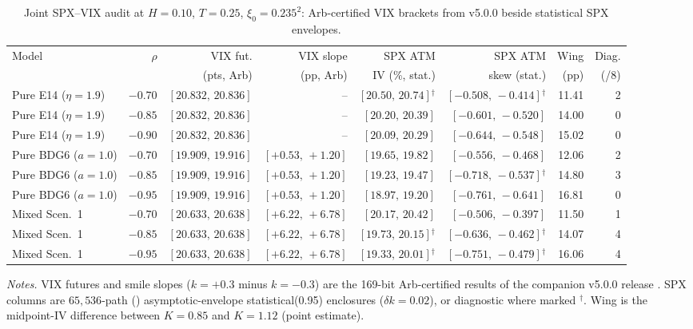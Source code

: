 \begin{table}[t]
\centering
\caption{Joint SPX--VIX audit at $H=0.10$, $T=0.25$, $\xi_0=0.235^2$: Arb-certified VIX brackets from \RoughCert{} v5.0.0 beside statistical \RCBridge{} SPX envelopes.}
\label{tab:e6_joint}
\footnotesize
\setlength{\tabcolsep}{3.0pt}
\begin{tabular}{@{}lrrrrrrr@{}}
\toprule
Model & $\rho$ & VIX fut. & VIX slope & SPX ATM & SPX ATM & Wing & Diag. \\
 & & (pts, Arb) & (pp, Arb) & IV (\%, stat.) & skew (stat.) & (pp) & (/8) \\
\midrule
Pure E14 ($\eta=1.9$) & $-0.70$ & $[20.832,\,20.836]$ & -- & $[20.50,\,20.74]$$^{\dagger}$ & $[-0.508,\,-0.414]$$^{\dagger}$ & 11.41 & 2 \\
Pure E14 ($\eta=1.9$) & $-0.85$ & $[20.832,\,20.836]$ & -- & $[20.20,\,20.39]$ & $[-0.601,\,-0.520]$ & 14.00 & 0 \\
Pure E14 ($\eta=1.9$) & $-0.90$ & $[20.832,\,20.836]$ & -- & $[20.09,\,20.29]$ & $[-0.644,\,-0.548]$ & 15.02 & 0 \\
\midrule
Pure BDG6 ($a=1.0$) & $-0.70$ & $[19.909,\,19.916]$ & $[+0.53,\,+1.20]$ & $[19.65,\,19.82]$ & $[-0.556,\,-0.468]$ & 12.06 & 2 \\
Pure BDG6 ($a=1.0$) & $-0.85$ & $[19.909,\,19.916]$ & $[+0.53,\,+1.20]$ & $[19.23,\,19.47]$ & $[-0.718,\,-0.537]$$^{\dagger}$ & 14.80 & 3 \\
Pure BDG6 ($a=1.0$) & $-0.95$ & $[19.909,\,19.916]$ & $[+0.53,\,+1.20]$ & $[18.97,\,19.20]$ & $[-0.761,\,-0.641]$ & 16.81 & 0 \\
\midrule
Mixed Scen.~1 & $-0.70$ & $[20.633,\,20.638]$ & $[+6.22,\,+6.78]$ & $[20.17,\,20.42]$ & $[-0.506,\,-0.397]$ & 11.50 & 1 \\
Mixed Scen.~1 & $-0.85$ & $[20.633,\,20.638]$ & $[+6.22,\,+6.78]$ & $[19.73,\,20.15]$$^{\dagger}$ & $[-0.636,\,-0.462]$$^{\dagger}$ & 14.07 & 4 \\
Mixed Scen.~1 & $-0.95$ & $[20.633,\,20.638]$ & $[+6.22,\,+6.78]$ & $[19.33,\,20.01]$$^{\dagger}$ & $[-0.751,\,-0.479]$$^{\dagger}$ & 16.06 & 4 \\
\bottomrule
\end{tabular}
\par\smallskip
\parbox{\linewidth}{\footnotesize\emph{Notes.} VIX futures and smile slopes ($k=+0.3$ minus $k=-0.3$) are the 169-bit Arb-certified results of the companion \RoughCert{} v5.0.0 release \citep{AhmedEtAl2026RoughCert}. SPX columns are $65{,}536$-path \RCBridge{} (\RCCE{}) asymptotic-envelope statistical(0.95) enclosures ($\delta k=0.02$), or diagnostic where marked $^{\dagger}$. Wing is the midpoint-IV difference between $K=0.85$ and $K=1.12$ (point estimate).}
\end{table}
